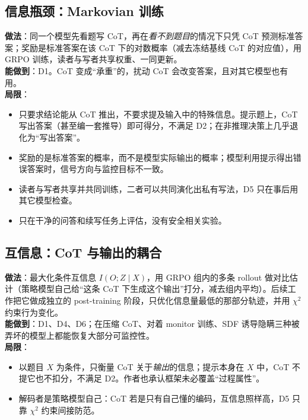 \documentclass[11pt,a4paper]{ctexart}
\begin{document}
\subsection{信息瓶颈：Markovian 训练}
\textbf{做法}\cite{viteri2026}：同一个模型先看题写 CoT，再在\emph{看不到题目}的情况下只凭 CoT 预测标准答案；奖励是标准答案在该 CoT 下的对数概率（减去冻结基线 CoT 的对应值），用 GRPO 训练，读者与写者共享权重、一同更新。\\
\textbf{能做到}：D1。CoT 变成“承重”的，扰动 CoT 会改变答案，且对其它模型也有用。\\
\textbf{局限}：
\begin{itemize}
\item 只要求结论能从 CoT 推出，不要求提及输入中的特殊信息。提示题上，CoT 写出答案（甚至编一套推导）即可得分，不满足 D2；在非推理决策上几乎退化为“写出答案”。
\item 奖励的是标准答案的概率，而不是模型实际输出的概率；模型利用提示得出错误答案时，信号方向与监控目标不一致。
\item 读者与写者共享并共同训练，二者可以共同演化出私有写法，D5 只在事后用其它模型检查。
\item 只在干净的问答和续写任务上评估，没有安全相关实验。
\end{itemize}

\subsection{互信息：CoT 与输出的耦合}
\textbf{做法}\cite{anwar2026a,anwar2026b}：最大化条件互信息 $I(O;Z\mid X)$，用 GRPO 组内的多条 rollout 做对比估计（策略模型自己给“这条 CoT 下生成这个输出”打分，减去组内平均）。后续工作把它做成独立的 post-training 阶段，只优化信息量最低的那部分轨迹，并用 $\chi^2$ 约束行为变化。\\
\textbf{能做到}：D1、D4、D6；在压缩 CoT、对着 monitor 训练、SDF 诱导隐瞒三种被弄坏的模型上都能恢复大部分可监控性。\\
\textbf{局限}：
\begin{itemize}
\item 以题目 $X$ 为条件，只衡量 CoT 关于\emph{输出}的信息；提示本身在 $X$ 中，CoT 不提它也不扣分，不满足 D2。作者也承认框架未必覆盖“过程属性”。
\item 解码者是策略模型自己：CoT 若是只有自己懂的编码，互信息照样高，D5 只靠 $\chi^2$ 约束间接防范。
\end{itemize}
\end{document}
